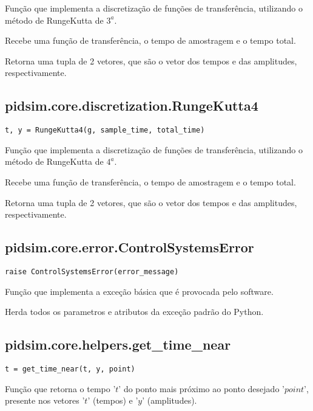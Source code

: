     Função que implementa a discretização de funções de transferência,
    utilizando o método de RungeKutta de $3^a$.
    
    Recebe uma função de transferência, o tempo de amostragem e o tempo
    total.
    
    Retorna uma tupla de 2 vetores, que são o vetor dos tempos e das amplitudes,
    respectivamente.

\subsection{pidsim.core.discretization.RungeKutta4}

    \begin{verbatim}
t, y = RungeKutta4(g, sample_time, total_time)
    \end{verbatim}
    
    Função que implementa a discretização de funções de transferência,
    utilizando o método de RungeKutta de $4^a$.
    
    Recebe uma função de transferência, o tempo de amostragem e o tempo
    total.
    
    Retorna uma tupla de 2 vetores, que são o vetor dos tempos e das amplitudes,
    respectivamente.

\subsection{pidsim.core.error.ControlSystemsError}

    \begin{verbatim}
raise ControlSystemsError(error_message)
    \end{verbatim}
    
    Função que implementa a exceção básica que é provocada pelo software.
    
    Herda todos os parametros e atributos da exceção padrão do Python.

\subsection{pidsim.core.helpers.get\_time\_near}

    \begin{verbatim}
t = get_time_near(t, y, point)
    \end{verbatim}
    
    Função que retorna o tempo '$t$' do ponto mais próximo ao ponto
    desejado '$point$', presente nos vetores '$t$' (tempos) e '$y$'
    (amplitudes).
    
